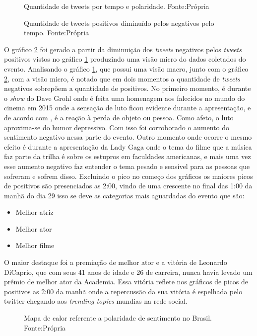 \begin{figure}[!h]
	\centering{}
	\caption{Quantidade de tweets por tempo e polaridade. Fonte:Própria}
	\label{qtd}
\end{figure}

\begin{figure}[!h]
	\centering{}
	\caption{Quantidade de tweets positivos diminuído pelos negativos pelo tempo. Fonte:Própria}
	\label{qtdnegpos}
\end{figure}

O gráfico \ref{qtdnegpos} foi gerado a partir da diminuição dos \textit{tweets} negativos pelos \textit{tweets} positivos vistos no gráfico \ref{qtd} produzindo uma visão micro do dados coletados do evento. Analisando o gráfico \ref{qtd}, que possui uma visão macro, junto com o gráfico \ref{qtdnegpos}, com a visão micro, é notado que em dois momentos a quantidade de \textit{tweets} negativos sobrepõem a quantidade de positivos. No primeiro momento, é durante o \textit{show} do Dave Grohl onde é feita uma homenagem aos falecidos no mundo do cinema em 2015 onde a sensação de luto ficou evidente durante a apresentação, e de acordo com \cite{freud1908conferencias}, é a reação à perda de objeto ou pessoa. Como afeto, o luto aproxima-se do humor depressivo. Com isso foi corroborado o aumento do sentimento negativo nessa parte do evento. Outro momento onde ocorre o mesmo efeito é durante a apresentação da Lady Gaga onde o tema do filme que a  música faz parte da trilha é sobre os estupros em faculdades americanas, e mais uma vez esse aumento negativo faz entender o tema pesado e sensível para as pessoas que sofreram e sofrem disso. Excluindo o pico no começo dos gráficos os maiores picos de positivos são presenciados as 2:00, vindo de uma crescente no final das 1:00 da manhã do dia 29 isso se deve as categorias mais aguardadas do evento que são:

 \begin{itemize}
 	\item Melhor atriz
 	\item Melhor ator
 	\item Melhor filme
 \end{itemize}

O maior destaque foi a premiação de melhor ator e a vitória de Leonardo DiCaprio, que com seus 41 anos de idade e 26 de carreira, nunca havia levado um prêmio de melhor ator da Academia. Essa vitória reflete nos gráficos de picos de positivos as 2:00 da manhã onde a repercussão da sua vitória é espelhada pelo twitter chegando aos \textit{trending topics} mundias na rede social.


\begin{figure}[!h]
	\centering{}
	\caption{Mapa de calor referente a polaridade de sentimento no Brasil. Fonte:Própria}
	\label{mapa}
\end{figure}